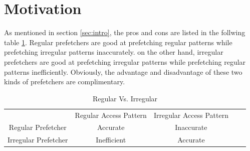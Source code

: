 \section{Motivation}
\label{sec:motivation}
As mentioned in section \ref{sec:intro}, the pros and cons are listed in the follwing table \ref{table:regVsirreg}. 
Regular prefetchers are good at prefetching regular patterns while prefetching irregular patterns inaccurately. on the other hand, irregular prefetchers are good at prefetching irregular patterns while prefetching regular patterns inefficiently. Obviously, the advantage and disadvantage of these two kinds of prefetchers are complimentary. 

\begin{table}[ht!]
\centering
\begin{tabular}{cccll}
\cline{1-3}
\multicolumn{1}{|c|}{}                     & \multicolumn{1}{c|}{Regular Access Pattern}             & \multicolumn{1}{c|}{Irregular Access Pattern}          &  &  \\ \cline{1-3}
\multicolumn{1}{|c|}{Regular Prefetcher}   & \multicolumn{1}{c|}{Accurate}              & \multicolumn{1}{c|}{{\color[HTML]{FE0000} Inaccurate}} &  &  \\ \cline{1-3}
\multicolumn{1}{|c|}{Irregular Prefetcher} & \multicolumn{1}{c|}{{\color[HTML]{FE0000} Inefficient}} & \multicolumn{1}{c|}{Accurate} &  &  \\ \cline{1-3}
\end{tabular}
\caption{Regular Vs. Irregular}
\label{table:regVsirreg}
\end{table}

